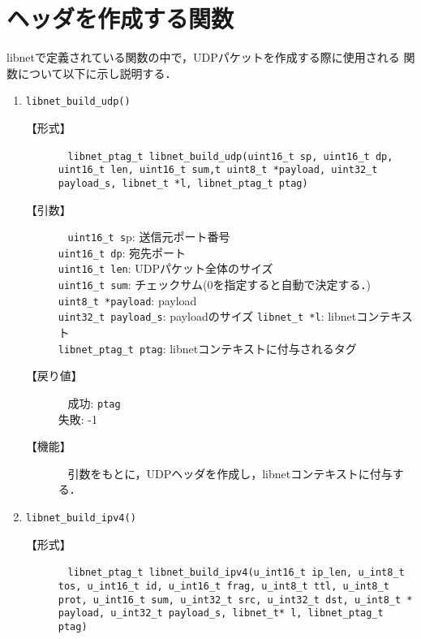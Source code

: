 \documentclass[12pt]{jsarticle}
\begin{document}
\section{ヘッダを作成する関数}
libnetで定義されている関数の中で，UDPパケットを作成する際に使用される
関数について以下に示し説明する．
\begin{enumerate}
    \item {\tt libnet\_build\_udp()}
        \begin{description}
            \item[【形式】]~\newline
                {\tt libnet\_ptag\_t libnet\_build\_udp(uint16\_t sp, uint16\_t dp, uint16\_t len, uint16\_t sum,t uint8\_t *payload, uint32\_t payload\_s, libnet\_t *l, libnet\_ptag\_t ptag)}
            \item[【引数】]~\newline
                {\tt uint16\_t s}p: 送信元ポート番号\\
                {\tt uint16\_t dp}: 宛先ポート\\
                {\tt uint16\_t len}: UDPパケット全体のサイズ\\
                {\tt uint16\_t sum}: チェックサム(0を指定すると自動で決定する．)\\
                {\tt uint8\_t *payload}: payload\\
                {\tt uint32\_t payload\_s}: payloadのサイズ
                {\tt libnet\_t *l}: libnetコンテキスト\\
                {\tt libnet\_ptag\_t ptag}: libnetコンテキストに付与されるタグ\\
            \item[【戻り値】]~\newline
                成功: {\tt ptag}\\
                失敗: -1\\
            \item[【機能】]~\newline
                引数をもとに，UDPヘッダを作成し，libnetコンテキストに付与する．
        \end{description}
    \item {\tt libnet\_build\_ipv4()}
        \begin{description}
            \item[【形式】]~\newline
                {\tt libnet\_ptag\_t libnet\_build\_ipv4(u\_int16\_t ip\_len, u\_int8\_t tos, u\_int16\_t id, u\_int16\_t frag, u\_int8\_t ttl, u\_int8\_t prot, u\_int16\_t sum, u\_int32\_t src, u\_int32\_t dst, u\_int8\_t * payload, u\_int32\_t payload\_s, libnet\_t* l, libnet\_ptag\_t ptag)}

\end{description}
\end{enumerate}
\end{document}
